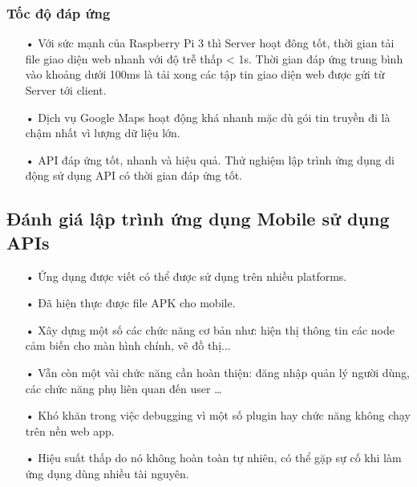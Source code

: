 \subsubsection*{Tốc độ đáp ứng}
\begin{itemize}
	\item[•] Với sức mạnh của Raspberry Pi 3 thì Server hoạt đông tốt, thời gian tải file giao diện web nhanh với độ trễ thấp < 1s. Thời gian đáp ứng trung bình vào khoảng dưới 100ms là tải xong các tập tin giao diện web được gửi từ Server tới client.
	\item[•] Dịch vụ Google Maps hoạt động khá nhanh mặc dù gói tin truyền đi là chậm nhất vì lượng dữ liệu lớn.
	\item[•] API đáp ứng tốt, nhanh và hiệu quả. Thử nghiệm lập trình ứng dụng di động sử dụng API có thời gian đáp ứng tốt.
\end{itemize}

\subsection{Đánh giá lập trình ứng dụng Mobile sử dụng APIs}
\begin{itemize}
\item[•]Ứng dụng được viết có thể được sử dụng trên nhiều platforms.
\item[•]Đã hiện thực được file APK cho mobile.
\item[•]Xây dựng một số các chức năng cơ bản như: hiện thị thông tin các node cảm biến cho màn hình chính, vẽ đồ thị...
\item[•] Vẫn còn một vài chức năng cần hoàn thiện: đăng nhập quản lý người dùng, các chức năng phụ liên quan đến user …
\item[•] Khó khăn trong việc debugging vì một số plugin hay chức năng không chạy trên nền web app. 
\item[•]Hiệu suất thấp do nó không hoàn toàn tự nhiên, có thể gặp sự cố khi làm ứng dụng dùng nhiều tài nguyên.

\end{itemize}